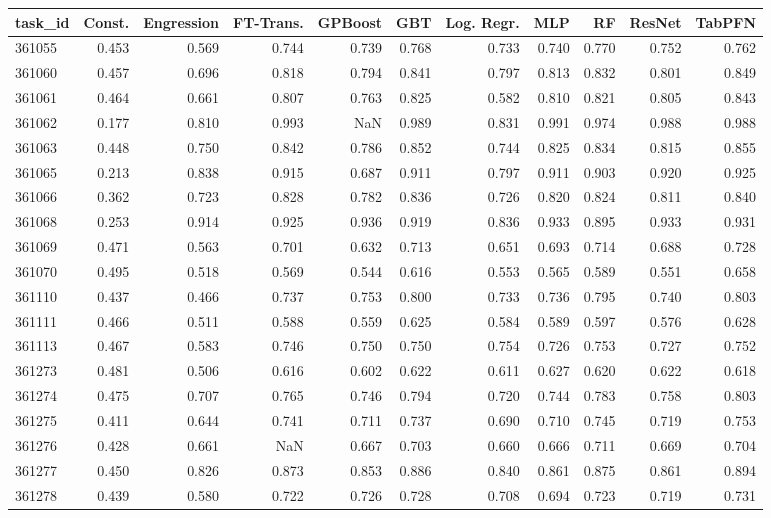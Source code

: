 \begin{tabular}{lrrrrrrrrrr}
\toprule
task\_id & Const. & Engression & FT-Trans. & GPBoost & GBT & Log. Regr. & MLP & RF & ResNet & TabPFN \\
\midrule
361055 & 0.453 & 0.569 & 0.744 & 0.739 & 0.768 & 0.733 & 0.740 & 0.770 & 0.752 & 0.762 \\
361060 & 0.457 & 0.696 & 0.818 & 0.794 & 0.841 & 0.797 & 0.813 & 0.832 & 0.801 & 0.849 \\
361061 & 0.464 & 0.661 & 0.807 & 0.763 & 0.825 & 0.582 & 0.810 & 0.821 & 0.805 & 0.843 \\
361062 & 0.177 & 0.810 & 0.993 & NaN & 0.989 & 0.831 & 0.991 & 0.974 & 0.988 & 0.988 \\
361063 & 0.448 & 0.750 & 0.842 & 0.786 & 0.852 & 0.744 & 0.825 & 0.834 & 0.815 & 0.855 \\
361065 & 0.213 & 0.838 & 0.915 & 0.687 & 0.911 & 0.797 & 0.911 & 0.903 & 0.920 & 0.925 \\
361066 & 0.362 & 0.723 & 0.828 & 0.782 & 0.836 & 0.726 & 0.820 & 0.824 & 0.811 & 0.840 \\
361068 & 0.253 & 0.914 & 0.925 & 0.936 & 0.919 & 0.836 & 0.933 & 0.895 & 0.933 & 0.931 \\
361069 & 0.471 & 0.563 & 0.701 & 0.632 & 0.713 & 0.651 & 0.693 & 0.714 & 0.688 & 0.728 \\
361070 & 0.495 & 0.518 & 0.569 & 0.544 & 0.616 & 0.553 & 0.565 & 0.589 & 0.551 & 0.658 \\
361110 & 0.437 & 0.466 & 0.737 & 0.753 & 0.800 & 0.733 & 0.736 & 0.795 & 0.740 & 0.803 \\
361111 & 0.466 & 0.511 & 0.588 & 0.559 & 0.625 & 0.584 & 0.589 & 0.597 & 0.576 & 0.628 \\
361113 & 0.467 & 0.583 & 0.746 & 0.750 & 0.750 & 0.754 & 0.726 & 0.753 & 0.727 & 0.752 \\
361273 & 0.481 & 0.506 & 0.616 & 0.602 & 0.622 & 0.611 & 0.627 & 0.620 & 0.622 & 0.618 \\
361274 & 0.475 & 0.707 & 0.765 & 0.746 & 0.794 & 0.720 & 0.744 & 0.783 & 0.758 & 0.803 \\
361275 & 0.411 & 0.644 & 0.741 & 0.711 & 0.737 & 0.690 & 0.710 & 0.745 & 0.719 & 0.753 \\
361276 & 0.428 & 0.661 & NaN & 0.667 & 0.703 & 0.660 & 0.666 & 0.711 & 0.669 & 0.704 \\
361277 & 0.450 & 0.826 & 0.873 & 0.853 & 0.886 & 0.840 & 0.861 & 0.875 & 0.861 & 0.894 \\
361278 & 0.439 & 0.580 & 0.722 & 0.726 & 0.728 & 0.708 & 0.694 & 0.723 & 0.719 & 0.731 \\

\end{tabular}
